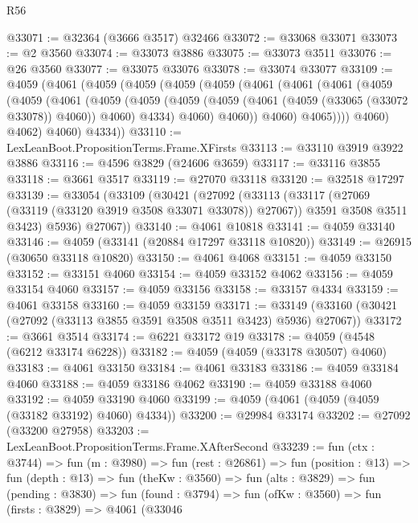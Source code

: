\begin{lexlean}{R56}
\begin{coremodule}
@33071 := @32364 (@3666 @3517) @32466
@33072 := @33068 @33071
@33073 := @2 @3560
@33074 := @33073 @3886
@33075 := @33073 @3511
@33076 := @26 @3560
@33077 := @33075 @33076
@33078 := @33074 @33077
@33109 := @4059
    (@4061
      (@4059
        (@4059
          (@4059
            (@4059
              (@4061
                (@4061
                  (@4061
                    (@4059
                      (@4059
                        (@4061
                          (@4059
                            (@4059
                              (@4059
                                (@4059 (@4061 (@4059 (@33065 (@33072 @33078)) @4060)) @4060)
                                @4334)
                              @4060)
                            @4060))
                        @4060)
                      @4065))))
              @4060)
            @4062)
          @4060)
        @4334))
@33110 := LexLeanBoot.PropositionTerms.Frame.XFirsts
@33113 := @33110 @3919 @3922 @3886
@33116 := @4596 @3829 (@24606 @3659)
@33117 := @33116 @3855
@33118 := @3661 @3517
@33119 := @27070 @33118
@33120 := @32518 @17297
@33139 := @33054
    (@33109
      (@30421
        (@27092
          (@33113
            (@33117 (@27069 (@33119 (@33120 @3919 @3508 @33071 @33078)) @27067))
            @3591
            @3508
            @3511
            @3423)
          @5936)
        @27067))
@33140 := @4061 @10818
@33141 := @4059 @33140
@33146 := @4059 (@33141 (@20884 @17297 @33118 @10820))
@33149 := @26915 (@30650 @33118 @10820)
@33150 := @4061 @4068
@33151 := @4059 @33150
@33152 := @33151 @4060
@33154 := @4059 @33152 @4062
@33156 := @4059 @33154 @4060
@33157 := @4059 @33156
@33158 := @33157 @4334
@33159 := @4061 @33158
@33160 := @4059 @33159
@33171 := @33149 (@33160 (@30421 (@27092 (@33113 @3855 @3591 @3508 @3511 @3423) @5936) @27067))
@33172 := @3661 @3514
@33174 := @6221 @33172 @19
@33178 := @4059 (@4548 (@6212 @33174 @6228))
@33182 := @4059 (@4059 (@33178 @30507) @4060)
@33183 := @4061 @33150
@33184 := @4061 @33183
@33186 := @4059 @33184 @4060
@33188 := @4059 @33186 @4062
@33190 := @4059 @33188 @4060
@33192 := @4059 @33190 @4060
@33199 := @4059 (@4061 (@4059 (@4059 (@33182 @33192) @4060) @4334))
@33200 := @29984 @33174
@33202 := @27092 (@33200 @27958)
@33203 := LexLeanBoot.PropositionTerms.Frame.XAfterSecond
@33239 := fun (ctx : @3744) =>
  fun (m : @3980) =>
  fun (rest : @26861) =>
  fun (position : @13) =>
  fun (depth : @13) =>
  fun (theKw : @3560) =>
  fun (alts : @3829) =>
  fun (pending : @3830) =>
  fun (found : @3794) =>
  fun (ofKw : @3560) =>
  fun (firsts : @3829) =>
  @4061
    (@33046

\end{coremodule}
\end{lexlean}
